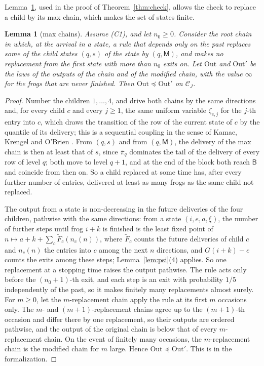 \documentclass[11pt]{amsart}
\newtheorem{lemma}[theorem]{Lemma}
\theoremstyle{definition}
\numberwithin{equation}{section}
\newcommand{\lean}[1]{\ignorespaces}
\newcommand{\cC}{\mathcal{C}}
\newcommand{\stle}{\preceq}
\begin{document}
Lemma~\ref{lem:maxchain}, used in the proof of Theorem~\ref{thm:check}, allows the check to replace a child by its max chain, which makes the set of states finite.

\begin{lemma}[max chains]\label{lem:maxchain}\lean{FrogModel.Engine.couplingLE_redirect, FrogModel.Engine.isSim_childStep}
Assume (C1), and let $n_0\ge0$. Consider the root chain in which, at the arrival in a state, a rule that depends only on the past replaces some of the child states $(q,s)$ of the state by $(q,\mathsf M)$, and makes no replacement from the first state with more than $n_0$ exits on. Let $\mathrm{Out}$ and $\mathrm{Out}'$ be the laws of the outputs of the chain and of the modified chain, with the value $\infty$ for the frogs that are never finished. Then $\mathrm{Out}\stle\mathrm{Out}'$ on $\cC_J$.
\end{lemma}

\begin{proof}
Number the children $1,\dots,4$, and drive both chains by the same directions and, for every child $c$ and every $j\ge1$, the same uniform variable $\zeta_{c,j}$ for the $j$-th entry into $c$, which draws the transition of the row of the current state of $c$ by the quantile of its delivery; this is a sequential coupling in the sense of Kamae, Krengel and O'Brien \cite[Proposition~1]{KKO77}. From $(q,s)$ and from $(q,\mathsf M)$, the delivery of the max chain is then at least that of $s$, since $\bar\pi_q$ dominates the tail of the delivery of every row of level $q$; both move to level $q+1$, and at the end of the block both reach $\mathsf B$ and coincide from then on. So a child replaced at some time has, after every further number of entries, delivered at least as many frogs as the same child not replaced.

The output from a state is non-decreasing in the future deliveries of the four children, pathwise with the same directions: from a state $(i,e,a,\xi)$, the number of further steps until frog $i+k$ is finished is the least fixed point of $n\mapsto a+k+\sum_c\tilde F_c(n_c(n))$, where $\tilde F_c$ counts the future deliveries of child $c$ and $n_c(n)$ the entries into $c$ among the next $n$ directions, and $G(i+k)-e$ counts the exits among these steps; Lemma~\ref{lem:psi}(4) applies. So one replacement at a stopping time raises the output pathwise. The rule acts only before the $(n_0+1)$-th exit, and each step is an exit with probability $1/5$ independently of the past, so it makes finitely many replacements almost surely. For $m\ge0$, let the $m$-replacement chain apply the rule at its first $m$ occasions only. The $m$- and $(m+1)$-replacement chains agree up to the $(m+1)$-th occasion and differ there by one replacement, so their outputs are ordered pathwise, and the output of the original chain is below that of every $m$-replacement chain. On the event of finitely many occasions, the $m$-replacement chain is the modified chain for $m$ large. Hence $\mathrm{Out}\stle\mathrm{Out}'$. This is  in the formalization.
\end{proof}
\end{document}
